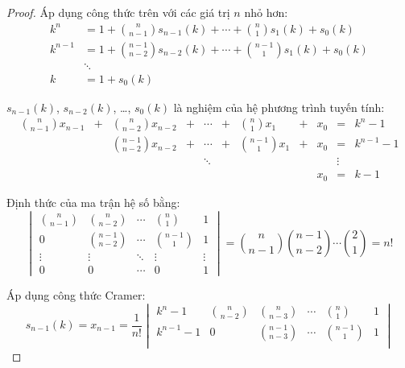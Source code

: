 \documentclass[class=linear-algebra,crop=false]{standalone}
\begin{document}
\begin{proof}
	\par Áp dụng công thức trên với các giá trị $n$ nhỏ hơn:
	\begin{align*}
		k^{n}   & = 1 + \binom{n}{n-1}s_{n-1}(k) + \cdots + \binom{n}{1}s_{1}(k) + s_{0}(k)     \\
		k^{n-1} & = 1 + \binom{n-1}{n-2}s_{n-2}(k) + \cdots + \binom{n-1}{1}s_{1}(k) + s_{0}(k) \\
		        & \ddots                                                                        \\
		k       & = 1 + s_{0}(k)
	\end{align*}
	\par $s_{n-1}(k)$, $s_{n-2}(k)$, \ldots, $s_{0}(k)$ là nghiệm của hệ phương trình tuyến tính:
	\[
		\begin{array}{ccccccccccc}
			\binom{n}{n-1}x_{n-1} & + & \binom{n}{n-2}x_{n-2}   & + & \cdots & + & \binom{n}{1}x_{1}   & + & x_{0} & =      & k^{n} - 1   \\
			                      &   & \binom{n-1}{n-2}x_{n-2} & + & \cdots & + & \binom{n-1}{1}x_{1} & + & x_{0} & =      & k^{n-1} - 1 \\
			                      &   &                         &   & \ddots &   &                     &   &       & \vdots &             \\
			                      &   &                         &   &        &   &                     &   & x_{0} & =      & k - 1
		\end{array}
	\]
	\par Định thức của ma trận hệ số bằng:
	\[
		\begin{vmatrix}
			\binom{n}{n-1} & \binom{n}{n-2}   & \cdots & \binom{n}{1}   & 1      \\
			0              & \binom{n-1}{n-2} & \cdots & \binom{n-1}{1} & 1      \\
			\vdots         & \vdots           & \ddots & \vdots         & \vdots \\
			0              & 0                & \cdots & 0              & 1
		\end{vmatrix}
		= \binom{n}{n-1}\binom{n-1}{n-2}\cdots\binom{2}{1}
		= n!
	\]
	\par Áp dụng công thức Cramer:
	\[
		s_{n-1}(k) = x_{n-1} = \dfrac{1}{n!}
		\begin{vmatrix}
			k^{n} - 1   & \binom{n}{n-2} & \binom{n}{n-3}   & \cdots & \binom{n}{1}   & 1      \\
			k^{n-1} - 1 & 0              & \binom{n-1}{n-3} & \cdots & \binom{n-1}{1} & 1      \\

\end{vmatrix}\]
\end{proof}
\end{document}

